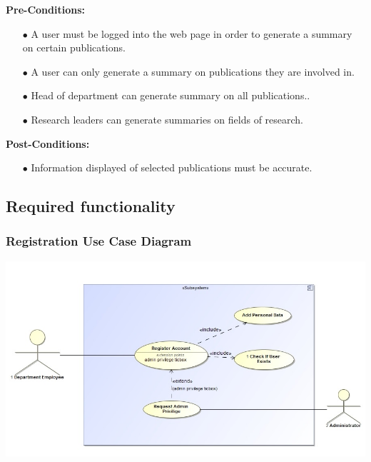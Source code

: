 \documentclass[a4paper,12pt]{article}
\begin{document}
\begin{itemize}
	\textbf{Pre-Conditions:}
	\begin{itemize}
		\item[$\bullet$]A user must be logged into the web page in order to generate a summary on certain publications.
		\item[$\bullet$]A user can only generate a summary on publications they are involved in.
		\item[$\bullet$]Head of department can generate summary on all publications..
		\item[$\bullet$]Research leaders can generate summaries on fields of research.
		\\
	\end{itemize}
	\textbf{Post-Conditions: }
	\begin{itemize}
		\item[$\bullet$]Information displayed of selected publications must be accurate.
		\\
	\end{itemize}
\end{itemize}
\subsection{Required functionality}
	\subsubsection{Registration Use Case Diagram}
	\includegraphics[width=1\textwidth]{./Registration.jpg}\\[1.5cm]
	 
\end{document}
